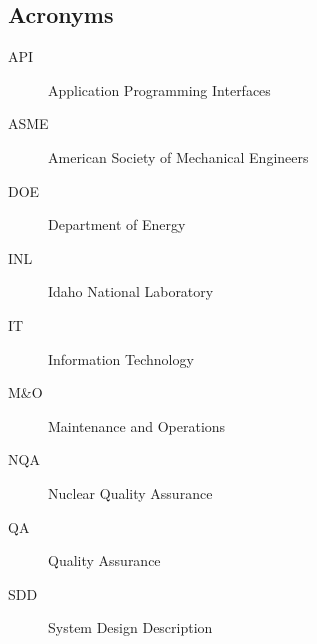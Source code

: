 \subsection{Acronyms}
\begin{description}
\item[API] Application Programming Interfaces
\item[ASME] American Society of Mechanical Engineers
\item[DOE] Department of Energy
\item[INL] Idaho National Laboratory
\item[IT] Information Technology
\item[M\&O] Maintenance and Operations
\item[NQA] Nuclear Quality Assurance
\item[QA] Quality Assurance
\item[SDD] System Design Description
\end{description}